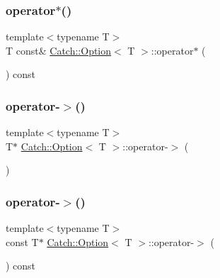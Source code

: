 \mbox{\label{class_catch_1_1_option_a734fc9c2eb1a1f7f8e8f6a4eb12160f0}} 
\subsubsection{\texorpdfstring{operator$\ast$()}{operator*()}\hspace{0.1cm}{\footnotesize\ttfamily [2/2]}}
{\footnotesize\ttfamily template$<$typename T$>$ \\
T const\& \hyperlink{class_catch_1_1_option}{Catch\+::\+Option}$<$ T $>$\+::operator$\ast$ (\begin{DoxyParamCaption}{ }\end{DoxyParamCaption}) const\hspace{0.3cm}{\ttfamily [inline]}}

\mbox{\label{class_catch_1_1_option_acad340798a16c8f700f8763119e90f31}} 
\subsubsection{\texorpdfstring{operator-\/$>$()}{operator->()}\hspace{0.1cm}{\footnotesize\ttfamily [1/2]}}
{\footnotesize\ttfamily template$<$typename T$>$ \\
T$\ast$ \hyperlink{class_catch_1_1_option}{Catch\+::\+Option}$<$ T $>$\+::operator-\/$>$ (\begin{DoxyParamCaption}{ }\end{DoxyParamCaption})\hspace{0.3cm}{\ttfamily [inline]}}

\mbox{\label{class_catch_1_1_option_ae8343cbc36dbb95b2dce333d2a6fdc28}} 
\subsubsection{\texorpdfstring{operator-\/$>$()}{operator->()}\hspace{0.1cm}{\footnotesize\ttfamily [2/2]}}
{\footnotesize\ttfamily template$<$typename T$>$ \\
const T$\ast$ \hyperlink{class_catch_1_1_option}{Catch\+::\+Option}$<$ T $>$\+::operator-\/$>$ (\begin{DoxyParamCaption}{ }\end{DoxyParamCaption}) const\hspace{0.3cm}{\ttfamily [inline]}}

